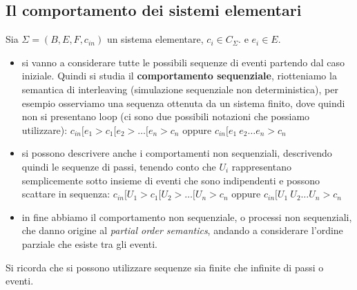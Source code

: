 \subsection{Il comportamento dei sistemi elementari}
Sia $\Sigma = (B,E,F, c_{in})$ un sistema elementare,  $c_{i} \in C_{\Sigma}$. e  $e_{i} \in E$.
\begin{itemize}
    \item si vanno a considerare tutte le possibili sequenze di eventi partendo dal caso iniziale. Quindi si studia il \textbf{comportamento sequenziale}, riotteniamo la semantica di interleaving (simulazione sequenziale non deterministica), per esempio osserviamo una sequenza ottenuta da un sistema finito, dove quindi non si presentano loop (ci sono due possibili notazioni che possiamo utilizzare):
    $c_{in} [e_1  > c_1[e_2 > \dots [e_n > c_n$ oppure $c_{in} [e_1\ e_2 \dots e_n> c_n$
    \item si possono descrivere anche i comportamenti non sequenziali, descrivendo quindi le sequenze di passi, tenendo conto che $U_i$ rappresentano semplicemente sotto insieme di eventi che sono indipendenti e possono scattare in sequenza:  
    $c_{in} [U_1  > c_1[U_2 > \dots [U_n > c_n$ oppure $c_{in} [U_1\ U_2 \dots U_n> c_n$
    \item in fine abbiamo il comportamento non sequenziale, o processi non sequenziali, che danno origine al \textit{partial order semantics}, andando a considerare l'ordine parziale che esiste tra gli eventi.
\end{itemize}
Si ricorda che si possono utilizzare sequenze sia finite che infinite di passi o eventi. 
{\centering
{}
\par}

